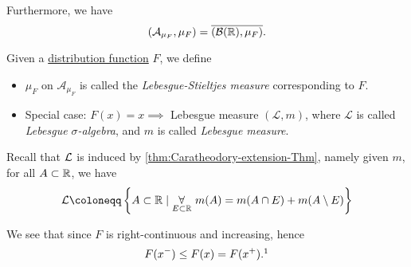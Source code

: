 Furthermore, we have
\[
	(\mathcal{A}_{\mu _F}, \mu _F) = \overline{(\mathcal{B} (\mathbb{\MakeUppercase{r}} ), \mu _F)}.
\]
\begin{definition}\label{def:Lebesgue-Stieltjes-measure}
	Given a \hyperref[def:distribution-function]{distribution function} \(F\), we define
	\begin{itemize}
		\item \(\mu _F\) on \(\mathcal{A} _{\mu _F}\) is called the \emph{Lebesgue-Stieltjes measure} corresponding to \(F\).
		      \item\label{def:Lebesgue-measure} Special case: \(F(x)=x\implies \) Lebesgue measure \((\mathcal{L} , m)\), where \(\mathcal{L} \) is called \emph{Lebesgue \(\sigma\)-algebra},
		      and \(m\) is called \emph{Lebesgue measure}.
	\end{itemize}
\end{definition}
\begin{remark}
	Recall that \(\mathcal{\MakeUppercase{l}} \) is induced by \autoref{thm:Caratheodory-extension-Thm}, namely given \(m\), for all \(A\subset \mathbb{\MakeUppercase{r}} \),
	we have
	\[
		\mathcal{\MakeUppercase{l}} \coloneqq \left\{A\subset \mathbb{\MakeUppercase{r}} \mid \underset{E\subset \mathbb{\MakeUppercase{r}} }{\forall }\ m(A) = m(A\cap E) + m(A\setminus E)\right\}
	\]
\end{remark}

\begin{note}
	We see that since \(F\) is right-continuous and increasing, hence
	\[
		F(x^-)\leq F(x) = F(x^+).\footnotemark
	\]
\end{note}

